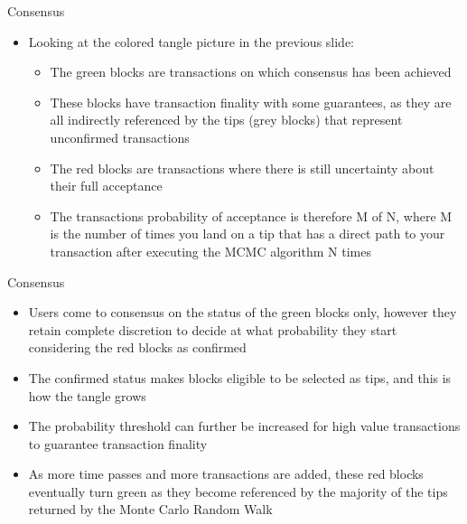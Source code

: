 \documentclass[10pt]{beamer}
\begin{document}

\begin{frame}{Consensus}
	\begin{itemize}
		\item Looking at the colored tangle picture in the previous slide:
		\begin{itemize}
			\item The green blocks are transactions on which consensus has been achieved
			\item These blocks have transaction finality with some guarantees, as they are all indirectly referenced by the tips (grey blocks) that represent unconfirmed transactions
			\item The red blocks are transactions where there is still uncertainty about their full acceptance
			\item The transactions probability of acceptance is therefore M of N, where M is the number of times you land on a tip that has a direct path to your transaction after executing the MCMC algorithm N times
		\end{itemize}
	\end{itemize}
\end{frame}


\begin{frame}{Consensus}
	\begin{itemize}
		\item Users come to consensus on the status of the green blocks only, however they retain complete discretion to decide at what probability they start considering the red blocks as confirmed
		\item The confirmed status makes blocks eligible to be selected as tips, and this is how the tangle grows
		\item The probability threshold can further be increased for high value transactions to guarantee transaction finality
		\item As more time passes and more transactions are added, these red blocks eventually turn green as they become referenced by the majority of the tips returned by the Monte Carlo Random Walk
	\end{itemize}
\end{frame}

\end{document}
